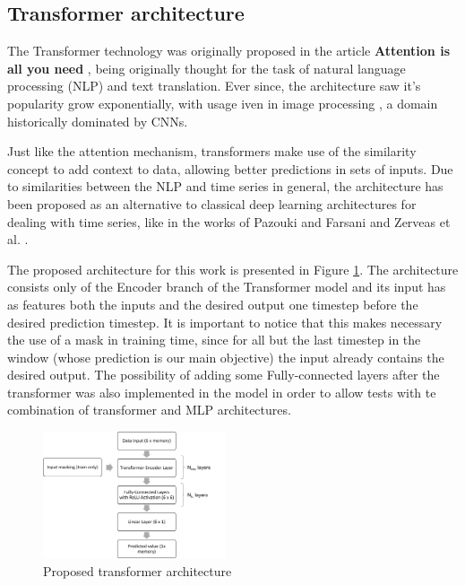 \documentclass[conference]{IEEEtran}
\begin{document}
\subsection{Transformer architecture}

The Transformer technology was originally proposed in the article \textbf{Attention is all you need} \cite{attention_is_all},
being originally thought for the task of natural language processing (NLP) and text translation. Ever since, the architecture
saw it's popularity grow exponentially, with usage iven in image processing \cite{transformers_for_images}, a domain historically
dominated by CNNs.

Just like the attention mechanism, transformers make use of the similarity concept to add context to data, allowing better predictions
in sets of inputs. Due to similarities between the NLP and time series in general, the architecture has been proposed as
an alternative to classical deep learning architectures for dealing with time series, like in the works of  Pazouki and Farsani \cite{transformers_ts_forecasting} and 
Zerveas et al. \cite{multivariate_ts_forecasting}.

The proposed architecture for this work is presented in Figure \ref{fig:transformer_architecture}. The architecture consists only of the
Encoder branch of the Transformer model and its input has as features both the inputs and the desired output one timestep before the
desired prediction timestep. It is important to notice that this makes necessary the use of a mask in training time, since for all but
the last timestep in the window (whose prediction is our main objective) the input already contains the desired output.
The possibility of adding some Fully-connected layers after the transformer was also implemented in the model
in order to allow tests with te combination of transformer and MLP architectures.

\begin{figure}[htbp]
    \centerline{\includegraphics[width=0.48\textwidth]{images/transformer_architecture.png}}
    \caption{Proposed transformer architecture}
    \label{fig:transformer_architecture}
\end{figure}
\end{document}

